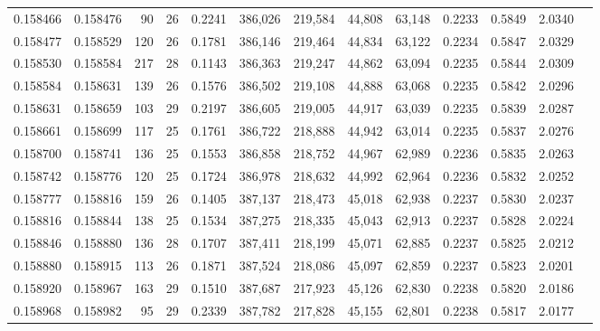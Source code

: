 \begin{tabular}{rrrrrrrrrrrrr}
0.158466 & 0.158476 &  90 &  26 &                                     0.2241 & 386,026 & 219,584 &  44,808 &  63,148 & 0.2233 & 0.5849 & 2.0340 \\
0.158477 & 0.158529 & 120 &  26 &                                     0.1781 & 386,146 & 219,464 &  44,834 &  63,122 & 0.2234 & 0.5847 & 2.0329 \\
0.158530 & 0.158584 & 217 &  28 &                                     0.1143 & 386,363 & 219,247 &  44,862 &  63,094 & 0.2235 & 0.5844 & 2.0309 \\
0.158584 & 0.158631 & 139 &  26 &                                     0.1576 & 386,502 & 219,108 &  44,888 &  63,068 & 0.2235 & 0.5842 & 2.0296 \\
0.158631 & 0.158659 & 103 &  29 &                                     0.2197 & 386,605 & 219,005 &  44,917 &  63,039 & 0.2235 & 0.5839 & 2.0287 \\
0.158661 & 0.158699 & 117 &  25 &                                     0.1761 & 386,722 & 218,888 &  44,942 &  63,014 & 0.2235 & 0.5837 & 2.0276 \\
0.158700 & 0.158741 & 136 &  25 &                                     0.1553 & 386,858 & 218,752 &  44,967 &  62,989 & 0.2236 & 0.5835 & 2.0263 \\
0.158742 & 0.158776 & 120 &  25 &                                     0.1724 & 386,978 & 218,632 &  44,992 &  62,964 & 0.2236 & 0.5832 & 2.0252 \\
0.158777 & 0.158816 & 159 &  26 &                                     0.1405 & 387,137 & 218,473 &  45,018 &  62,938 & 0.2237 & 0.5830 & 2.0237 \\
0.158816 & 0.158844 & 138 &  25 &                                     0.1534 & 387,275 & 218,335 &  45,043 &  62,913 & 0.2237 & 0.5828 & 2.0224 \\
0.158846 & 0.158880 & 136 &  28 &                                     0.1707 & 387,411 & 218,199 &  45,071 &  62,885 & 0.2237 & 0.5825 & 2.0212 \\
0.158880 & 0.158915 & 113 &  26 &                                     0.1871 & 387,524 & 218,086 &  45,097 &  62,859 & 0.2237 & 0.5823 & 2.0201 \\
0.158920 & 0.158967 & 163 &  29 &                                     0.1510 & 387,687 & 217,923 &  45,126 &  62,830 & 0.2238 & 0.5820 & 2.0186 \\
0.158968 & 0.158982 &  95 &  29 &                                     0.2339 & 387,782 & 217,828 &  45,155 &  62,801 & 0.2238 & 0.5817 & 2.0177 \\

\end{tabular}
